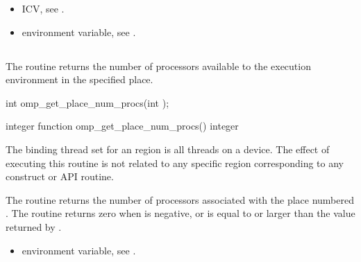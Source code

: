 \crossreferences
\begin{itemize}
\item {} ICV, see
.

\item {} environment variable, see
.
\end{itemize}



\subsection{}
\label{subsec:omp_get_place_num_procs}

\summary
The   routine returns the number of 
processors available to the execution environment in the specified place.

\format
\begin{ccppspecific}
\begin{ompcFunction}
int omp_get_place_num_procs(int );
\end{ompcFunction}
\end{ccppspecific}

\begin{fortranspecific}
\begin{ompfFunction}
integer function omp_get_place_num_procs()
integer 
\end{ompfFunction}
\end{fortranspecific}

\binding
The binding thread set for an   region is 
all threads on a device. The effect of executing this routine is not 
related to any specific region corresponding to any construct or API routine.

\effect
The  routine returns the number of
processors associated with the place numbered . The
routine returns zero when  is negative, or is equal
to or larger than the value returned by .

\crossreferences
\begin{itemize}
\item {} environment variable, see
.
\end{itemize}



